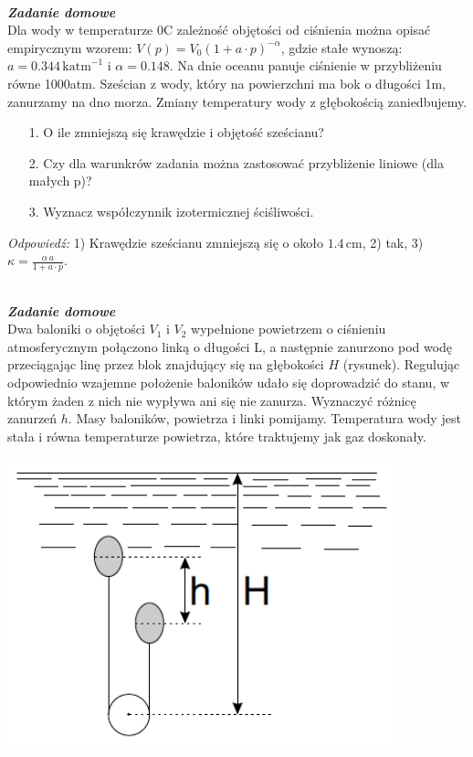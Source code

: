 \documentclass[11pt,a4paper]{article}
\newcounter{zaddom}\newcommand{\zaddom}[1][]{\addtocounter{zaddom}{1} ~\\  {\bf \emph{Zadanie domowe \arabic{zaddom} #1 }} \\}
\begin{document}
\zaddom
Dla wody w temperaturze 0\degree C zależność objętości od ciśnienia można opisać empirycznym wzorem: $V(p) = V_0 (1 + a\cdot p)^{-\alpha}$, gdzie stałe wynoszą: $a = 0.344\,\textrm{katm}^{-1}$ i $\alpha  = 0.148$. Na dnie oceanu panuje ciśnienie w przybliżeniu równe 1000atm. Sześcian z wody, który na powierzchni ma bok o długości 1m, zanurzamy na dno morza. Zmiany temperatury wody z głębokością zaniedbujemy.
\begin{itemize}
\item[1.] O ile zmniejszą się krawędzie i objętość sześcianu?
\item[2.] Czy dla warunkrów zadania można zastosować przybliżenie liniowe (dla małych p)?
\item[3.] Wyznacz współczynnik izotermicznej ściśliwości.
\end{itemize}
    {\em Odpowiedź:} 1) Krawędzie sześcianu zmniejszą się o około $1.4\,\textrm{cm}$,
    2) tak,
    3) $\kappa = \frac{\alpha\,a}{1 + a\cdot p}$.

\begin{minipage}{0.75\textwidth}
\zaddom  
Dwa baloniki o objętości $V_1$ i $V_2$ wypełnione powietrzem o ciśnieniu atmosferycznym połączono linką o długości L,
a następnie zanurzono pod wodę przeciągając linę przez blok znajdujący się na głębokości $H$ (rysunek). Regulując
odpowiednio wzajemne położenie baloników udało się doprowadzić do stanu, w którym żaden z nich nie wypływa ani się
nie zanurza. Wyznaczyć różnicę zanurzeń $h$. Masy baloników, powietrza i linki pomijamy. Temperatura wody jest stała
i równa temperaturze powietrza, które traktujemy jak gaz doskonały.\\

\end{minipage}
\begin{minipage}{0.25\textwidth}
\begin{center}

\includegraphics[width=0.85\textwidth]{baloniki.png}\\
\end{center}
\end{minipage}   
\end{document}
